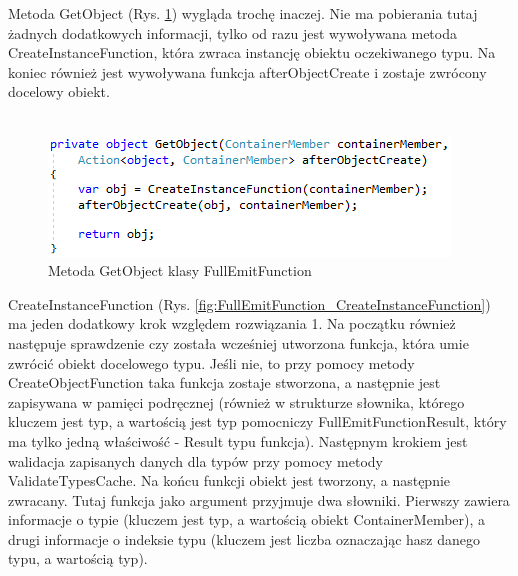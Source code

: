 \documentclass[12pt]{article}
\begin{document}
Metoda GetObject (Rys. \ref{fig:FullEmitFunction_GetObject}) wygląda trochę inaczej. Nie ma pobierania tutaj żadnych dodatkowych informacji, tylko od razu jest wywoływana metoda CreateInstanceFunction, która zwraca instancję obiektu oczekiwanego typu. Na koniec również jest wywoływana funkcja afterObjectCreate i zostaje zwrócony docelowy obiekt.\\ \\
\begin{figure}[H]
	\begin{center}
  		\includegraphics{FullEmitFunction_GetObject.png}
  		\caption{Metoda GetObject klasy FullEmitFunction}
  		\label{fig:FullEmitFunction_GetObject}
	\end{center}
\end{figure}

CreateInstanceFunction (Rys. \ref{fig:FullEmitFunction_CreateInstanceFunction}) ma jeden dodatkowy krok względem rozwiązania 1. Na początku również następuje sprawdzenie czy została wcześniej utworzona funkcja, która umie zwrócić obiekt docelowego typu. Jeśli nie, to przy pomocy metody CreateObjectFunction taka funkcja zostaje stworzona, a następnie jest zapisywana w pamięci podręcznej (również w strukturze słownika, którego kluczem jest typ, a wartością jest typ pomocniczy FullEmitFunctionResult, który ma tylko jedną właściwość - Result typu funkcja). Następnym krokiem jest walidacja zapisanych danych dla typów przy pomocy metody ValidateTypesCache. Na końcu funkcji obiekt jest tworzony, a następnie zwracany. Tutaj funkcja jako argument przyjmuje dwa słowniki. Pierwszy zawiera informacje o typie (kluczem jest typ, a wartością obiekt ContainerMember), a drugi informacje o indeksie typu (kluczem jest liczba oznaczając hasz danego typu, a wartością typ).\\
\end{document}
